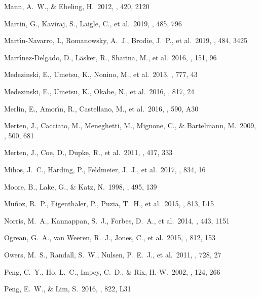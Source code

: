 \documentclass[iop,tighten,twocolumn,apj,floatfix]{emulateapj}
\begin{document}
\begin{thebibliography}{}
 Mann, A.~W., \& Ebeling,
    H.\ 2012, \mnras, 420, 2120

 Martin, G., Kaviraj, S., Laigle, C., et al.\ 2019, \mnras, 485, 796

 Mart{\'\i}n-Navarro, I., Romanowsky, A.~J., Brodie, J.~P., et al.\ 2019, \mnras, 484, 3425

    Mart{\'\i}nez-Delgado, D., L{\"a}sker, R., Sharina, M., et al.\ 2016, \aj,
    151, 96

 Medezinski, E., Umetsu,
K., Nonino, M., et al.\ 2013, \apj, 777, 43

 Medezinski, E., Umetsu,
K., Okabe, N., et al.\ 2016, \apj, 817, 24

 Merlin, E., Amor{\'{\i}}n,
R., Castellano, M., et al.\ 2016, \aap, 590, A30 

 Merten, J., Cacciato, M.,
Meneghetti, M., Mignone, C., \& Bartelmann, M.\ 2009, \aap, 500, 681

 Merten, J., Coe, D., Dupke,
R., et al.\ 2011, \mnras, 417, 333

 Mihos, J.~C., Harding, P., Feldmeier, J.~J., et al.\ 2017, \apj, 834, 16

 Moore, B., Lake, G., \& Katz, N.\ 1998, \apj, 495, 139

 Mu{\~n}oz, R.~P., Eigenthaler, P.,
Puzia, T.~H., et al.\ 2015, \apjl, 813, L15

 Norris, M.~A., Kannappan,
S.~J., Forbes, D.~A., et al.\ 2014, \mnras, 443, 1151

 Ogrean, G.~A., van Weeren, R.~J., Jones, C., et al.\ 2015, \apj, 812, 153

 Owers, M.~S., Randall,
S.~W., Nulsen, P.~E.~J., et al.\ 2011, \apj, 728, 27

 Peng, C.~Y., Ho, L.~C., Impey, C.~D., \&
Rix, H.-W.\ 2002, \aj, 124, 266

 Peng, E.~W., \& Lim, S.\
2016, \apjl, 822, L31


\end{thebibliography}
\end{document}
